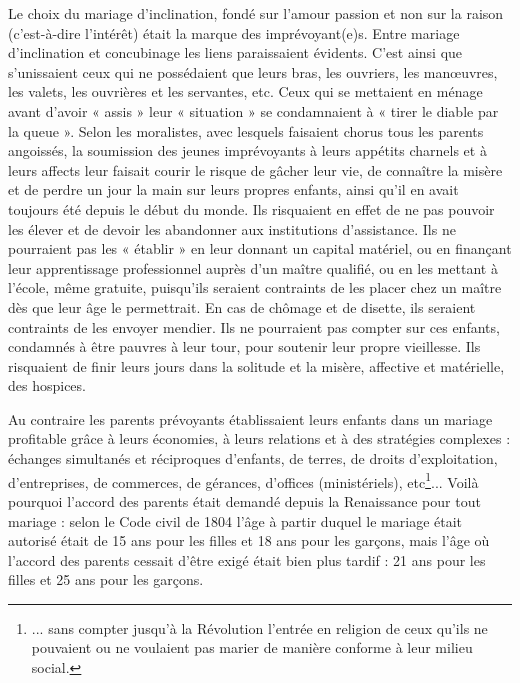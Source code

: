  Le choix du mariage d'inclination, fondé sur l'amour passion et non sur la raison (c'est-à-dire l'intérêt) était la marque des imprévoyant(e)s. Entre mariage d'inclination et concubinage les liens paraissaient évidents. C'est ainsi que s'unissaient ceux qui ne possédaient que leurs bras, les ouvriers, les manœuvres, les valets, les ouvrières et les servantes, etc. Ceux qui se mettaient en ménage avant d'avoir « assis » leur « situation » se condamnaient à « tirer le diable par la queue ». Selon les moralistes, avec lesquels faisaient chorus tous les parents angoissés, la soumission des jeunes imprévoyants à leurs appétits charnels et à leurs affects leur faisait courir le risque de gâcher leur vie, de connaître la misère et de perdre un jour la main sur leurs propres enfants, ainsi qu'il en avait toujours été depuis le début du monde. Ils risquaient en effet de ne pas pouvoir les élever et de devoir les abandonner aux institutions d'assistance. Ils ne pourraient pas les « établir » en leur donnant un capital matériel, ou en finançant leur apprentissage professionnel auprès d'un maître qualifié, ou en les mettant à l'école, même gratuite, puisqu'ils seraient contraints de les placer chez un maître dès que leur âge le permettrait. En cas de chômage et de disette, ils seraient contraints de les envoyer mendier. Ils ne pourraient pas compter sur ces enfants, condamnés à être pauvres à leur tour, pour soutenir leur propre vieillesse. Ils risquaient de finir leurs jours dans la solitude et la misère, affective et matérielle, des hospices.

 Au contraire les parents prévoyants établissaient leurs enfants dans un mariage profitable grâce à leurs économies, à leurs relations et à des stratégies complexes : échanges simultanés et réciproques d'enfants, de terres, de droits d'exploitation, d'entreprises, de commerces, de gérances, d'offices (ministériels), etc\footnote{... sans compter jusqu'à la Révolution l'entrée en religion de ceux qu'ils ne pouvaient ou ne voulaient pas marier de manière conforme à leur milieu social.}... Voilà pourquoi l'accord des parents était demandé depuis la Renaissance pour tout mariage : selon le Code civil de 1804 l'âge à partir duquel le mariage était autorisé était de 15 ans pour les filles et 18 ans pour les garçons, mais l'âge où l'accord des parents cessait d'être exigé était bien plus tardif : 21 ans pour les filles et 25 ans pour les garçons.
 

